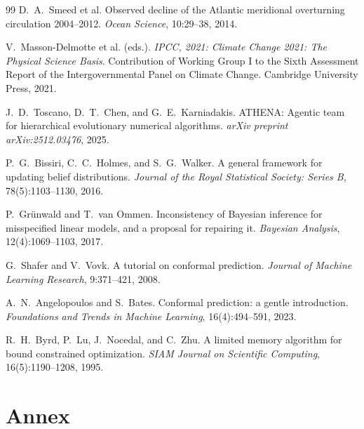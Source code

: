 \documentclass[12pt,a4paper]{article}
\theoremstyle{definition}
\theoremstyle{plain}
\begin{document}
{\begin{thebibliography}{99}
D.~A.~Smeed et al.
\newblock Observed decline of the Atlantic meridional overturning circulation 2004--2012.
\newblock \emph{Ocean Science}, 10:29--38, 2014.

V.~Masson-Delmotte et al. (eds.).
\newblock \emph{IPCC, 2021: Climate Change 2021: The Physical Science Basis}. Contribution of
Working Group I to the Sixth Assessment Report of the Intergovernmental Panel on Climate
Change.
\newblock Cambridge University Press, 2021.

J.~D.~Toscano, D.~T.~Chen, and G.~E.~Karniadakis.
\newblock ATHENA: Agentic team for hierarchical evolutionary numerical algorithms.
\newblock \emph{arXiv preprint arXiv:2512.03476}, 2025.

P.~G.~Bissiri, C.~C.~Holmes, and S.~G.~Walker.
\newblock A general framework for updating belief distributions.
\newblock \emph{Journal of the Royal Statistical Society: Series B}, 78(5):1103--1130, 2016.

P.~Gr\"unwald and T.~van Ommen.
\newblock Inconsistency of Bayesian inference for misspecified linear models, and a proposal
for repairing it.
\newblock \emph{Bayesian Analysis}, 12(4):1069--1103, 2017.

G.~Shafer and V.~Vovk.
\newblock A tutorial on conformal prediction.
\newblock \emph{Journal of Machine Learning Research}, 9:371--421, 2008.
 
A.~N.~Angelopoulos and S.~Bates.
\newblock Conformal prediction: a gentle introduction.
\newblock \emph{Foundations and Trends in Machine Learning}, 16(4):494--591, 2023.

R.~H.~Byrd, P.~Lu, J.~Nocedal, and C.~Zhu.
\newblock A limited memory algorithm for bound constrained optimization.
\newblock \emph{SIAM Journal on Scientific Computing}, 16(5):1190--1208, 1995.

\end{thebibliography}
}

\newpage
\appendix
{}
\section*{Annex}
\renewcommand{\thesection}{\Alph{section}}
\setcounter{section}{0}
\end{document}
